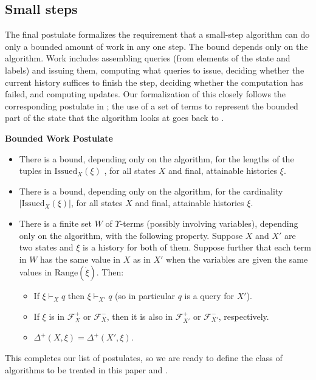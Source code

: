 \documentclass{LMCS}
\theoremstyle{definition}
\newenvironment{ls}{\begin{itemize}}{\end{itemize}}
\newenvironment{unn}[1]{\bigskip\noindent\textbf{#1}\quad}{\par\bigskip}
\newcommand{\DD}{\Delta^+}
\newcommand{\ans}{\dot}
\newcommand{\ran}[1]{\ensuremath{{\text{Range}}(#1)}}
\newcommand{\scr}[1]{\ensuremath{\mathcal {#1}}}
\newcommand{\Issued}{\text{Issued}}
\begin{document}
\subsection{Small steps}

The final postulate formalizes the requirement that a small-step
algorithm can do only a bounded amount of work in any one step.  The
bound depends only on the algorithm.  Work includes assembling queries
(from elements of the state and labels) and issuing them, computing
what queries to issue, deciding whether the current history suffices
to finish the step, deciding whether the computation has failed, and
computing updates.  Our formalization of this closely follows the
corresponding postulate in \cite[Section~5]{oa1}; the use of a set of
terms to represent the bounded part of the state that the algorithm
looks at goes back to \cite{seqth}.

\begin{unn}{Bounded Work Postulate}
\mbox{}
  \begin{ls}
    \item There is a bound, depending only on the algorithm, for the
    lengths of the tuples in $\Issued_X(\xi)$ , for all states $X$ and
    final, attainable histories $\xi$.
    \item There is a bound, depending only on the algorithm, for the
    cardinality $|\Issued_X(\xi)|$, for all states $X$ and final,
    attainable histories $\xi$.
    \item There is a finite set $W$ of $\Upsilon$-terms (possibly
    involving variables), depending only on the algorithm, with the
    following property.  Suppose $X$ and $X'$ are two states and $\xi$
    is a history for both of them.  Suppose further that each term in
    $W$ has the same value in $X$ as in $X'$ when the variables are
    given the same values in \ran{\ans\xi}.  Then:
    \begin{ls}
      \item If $\xi\vdash_Xq$ then $\xi\vdash_{X'}q$ (so in particular
      $q$ is a query for $X'$).
      \item If $\xi$ is in $\scr F_X^+$ or $\scr F_X^-$, then it is
      also in $\scr F_{X'}^+$ or $\scr F_{X'}^-$, respectively.
      \item $\DD(X,\xi)=\DD(X',\xi)$.
    \end{ls}
  \end{ls}
\end{unn}

This completes our list of postulates, so we are ready to define the
class of algorithms to be treated in this paper and \cite{ga2}.
\end{document}
